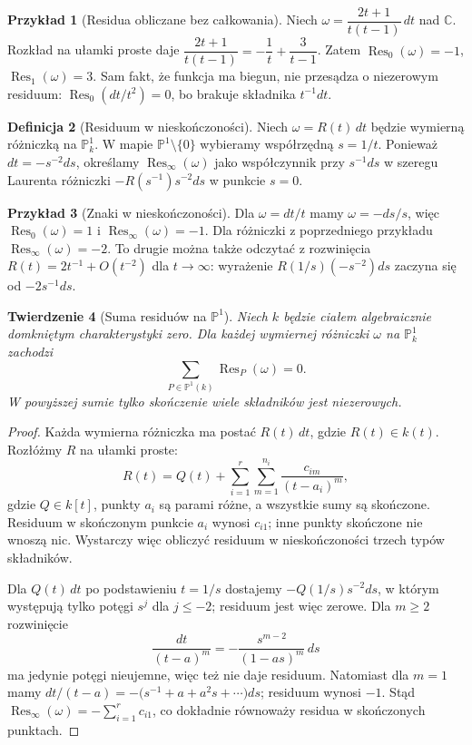 \documentclass[11pt,a4paper,openany]{report}
\numberwithin{equation}{section}
\theoremstyle{plain}
\newtheorem{twierdzenie}{Twierdzenie}[section]
\theoremstyle{definition}
\newtheorem{definicja}[twierdzenie]{Definicja}
\newtheorem{przyklad}[twierdzenie]{Przykład}
\theoremstyle{remark}
\newcommand{\C}{\mathbb C}
\newcommand{\PP}{\mathbb P}
\begin{document}
\begin{przyklad}[Residua obliczane bez całkowania]
Niech $\omega=\dfrac{2t+1}{t(t-1)}\,dt$ nad $\C$.
Rozkład na ułamki proste daje
$\dfrac{2t+1}{t(t-1)}=-\dfrac1t+\dfrac3{t-1}$.
Zatem $\operatorname{Res}_0(\omega)=-1$,
$\operatorname{Res}_1(\omega)=3$.
Sam fakt, że funkcja ma biegun, nie przesądza o niezerowym residuum:
$\operatorname{Res}_0(dt/t^2)=0$, bo brakuje składnika $t^{-1}dt$.
\end{przyklad}

\begin{definicja}[Residuum w nieskończoności]
Niech $\omega=R(t)\,dt$ będzie wymierną różniczką
na $\PP^1_k$. W mapie $\PP^1\setminus\{0\}$ wybieramy
współrzędną $s=1/t$. Ponieważ $dt=-s^{-2}ds$,
określamy
$\operatorname{Res}_{\infty}(\omega)$ jako współczynnik
przy $s^{-1}ds$ w szeregu Laurenta różniczki
$-R(s^{-1})s^{-2}ds$ w punkcie $s=0$.
\end{definicja}

\begin{przyklad}[Znaki w nieskończoności]
Dla $\omega=dt/t$ mamy $\omega=-ds/s$, więc
$\operatorname{Res}_0(\omega)=1$ i
$\operatorname{Res}_{\infty}(\omega)=-1$.
Dla różniczki z poprzedniego przykładu
$\operatorname{Res}_{\infty}(\omega)=-2$.
To drugie można także odczytać z rozwinięcia
$R(t)=2t^{-1}+O(t^{-2})$ dla $t\to\infty$:
wyrażenie $R(1/s)(-s^{-2})ds$ zaczyna się od
$-2s^{-1}ds$.
\end{przyklad}

\begin{twierdzenie}[Suma residuów na $\PP^1$]
\label{tw:sum-res-p1}
Niech $k$ będzie ciałem algebraicznie domkniętym charakterystyki
zero. Dla każdej wymiernej różniczki $\omega$ na
$\PP^1_k$ zachodzi
\[
 \sum_{P\in\PP^1(k)}\operatorname{Res}_{P}(\omega)=0.
\]
W powyższej sumie tylko skończenie wiele składników jest niezerowych.
\end{twierdzenie}
\begin{proof}
Każda wymierna różniczka ma postać $R(t)\,dt$, gdzie
$R(t)\in k(t)$. Rozłóżmy $R$ na ułamki proste:
\[
 R(t)=Q(t)+\sum_{i=1}^{r}\sum_{m=1}^{n_i}
 \frac{c_{im}}{(t-a_i)^m},
\]
gdzie $Q\in k[t]$, punkty $a_i$ są parami różne,
a wszystkie sumy są skończone. Residuum w skończonym
punkcie $a_i$ wynosi $c_{i1}$; inne punkty skończone
nie wnoszą nic. Wystarczy więc obliczyć residuum w nieskończoności
trzech typów składników.

Dla $Q(t)\,dt$ po podstawieniu $t=1/s$ dostajemy
$-Q(1/s)s^{-2}ds$, w którym występują tylko potęgi
$s^j$ dla $j\le-2$; residuum jest więc zerowe.
Dla $m\ge2$ rozwinięcie
\[
 \frac{dt}{(t-a)^m}
 =-\frac{s^{m-2}}{(1-as)^m}\,ds
\]
ma jedynie potęgi nieujemne, więc też nie daje residuum.
Natomiast dla $m=1$ mamy
$dt/(t-a)=-\bigl(s^{-1}+a+a^2s+\cdots\bigr)ds$;
residuum wynosi $-1$. Stąd
$\operatorname{Res}_\infty(\omega)=-\sum_{i=1}^r c_{i1}$,
co dokładnie równoważy residua w skończonych punktach.
\end{proof}
\end{document}
